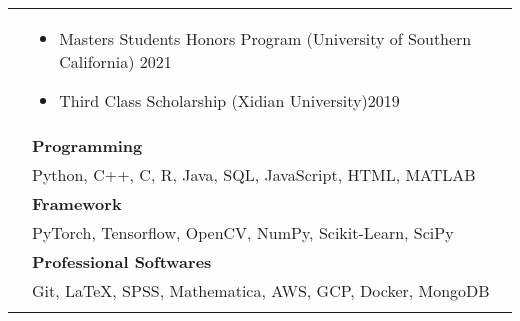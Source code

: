 \documentclass[letterpaper, 11pt]{article}
\begin{document}
\begin{longtable}{p{1.3in}p{4.8in}}




\newline
\nohyphens{{\color{black}{Honors and scholarships}}} 
&  \begin{itemize}[leftmargin=10pt, itemsep=-5pt, topsep=0pt]
    \item Masters Students Honors Program (University of Southern California) \hfill 2021
    \item Third Class Scholarship (Xidian University)\hfill 2019 
  \end{itemize}\\ 



{\color{black}{Skills}} 
& \textbf{Programming}\\
& Python, C++, C, R, Java, SQL, JavaScript, HTML, MATLAB \\
& \textbf{Framework} \\
& PyTorch, Tensorflow, OpenCV, NumPy, Scikit-Learn, SciPy \\
& \textbf{Professional Softwares} \\
& Git, LaTeX, SPSS, Mathematica, AWS, GCP, Docker, MongoDB \\
& \\



\end{longtable}
\end{document}
